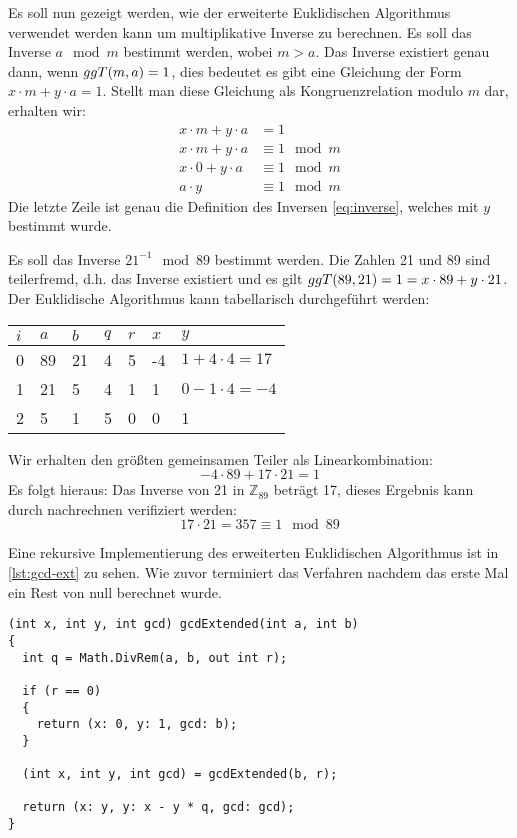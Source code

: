 \noindent
Es soll nun gezeigt werden, wie der erweiterte Euklidischen Algorithmus verwendet werden kann
um multiplikative Inverse zu berechnen. Es soll das Inverse $a \mod{m}$ bestimmt werden, wobei
$m > a$. Das Inverse existiert genau dann, wenn $ggT(m,a) = 1$, dies bedeutet es gibt
eine Gleichung der Form $x \cdot m + y \cdot a = 1$. Stellt man diese Gleichung
als Kongruenzrelation modulo $m$ dar, erhalten wir:
\begin{align*}
  x \cdot m + y \cdot a & = 1              \\
  x \cdot m + y \cdot a & \equiv 1 \mod{m} \\
  x \cdot 0 + y \cdot a & \equiv 1 \mod{m} \\
  a \cdot y             & \equiv 1 \mod{m}
\end{align*}
Die letzte Zeile ist genau die Definition des Inversen \eqref{eq:inverse}, welches
mit $y$ bestimmt wurde.
\begin{example}
  Es soll das Inverse $21^{-1} \mod{89}$ bestimmt werden. Die Zahlen 21 und 89 sind
  teilerfremd, d.h. das Inverse existiert und es gilt
  $ggT(89,21) = 1 = x \cdot 89 + y \cdot 21$. Der Euklidische
  Algorithmus kann tabellarisch durchgeführt werden:
  \begin{center}
    \centering
    \begin{tabular}{|l|l|l|l|l|l|l|}
      \hline
      $i$ & $a$ & $b$ & $q$ & $r$ & $x$ & $y$                  \\ \hline
      0   & 89  & 21  & 4   & 5   & -4  & $1 + 4 \cdot 4 = 17$ \\ \hline
      1   & 21  & 5   & 4   & 1   & 1   & $0 - 1 \cdot 4 = -4$ \\ \hline
      2   & 5   & 1   & 5   & 0   & 0   & 1                    \\ \hline
    \end{tabular}
  \end{center}
  \noindent
  Wir erhalten den größten gemeinsamen Teiler als Linearkombination:
  \begin{equation*}
    -4 \cdot 89 + 17 \cdot 21 = 1
  \end{equation*}
  Es folgt hieraus: Das Inverse von 21 in $\mathbb{Z}_{89}$ beträgt 17, dieses Ergebnis kann durch nachrechnen
  verifiziert werden:
  \begin{equation*}
    17 \cdot 21 = 357 \equiv 1 \mod{89}
  \end{equation*}
\end{example}

\noindent
Eine rekursive Implementierung des erweiterten Euklidischen Algorithmus ist in
\autoref{lst:gcd-ext} zu sehen.
Wie zuvor terminiert das Verfahren nachdem das erste
Mal ein Rest von null berechnet wurde.
\begin{lstlisting}[caption=Erweiterter Euklidischer Algorithmus, label=lst:gcd-ext]
(int x, int y, int gcd) gcdExtended(int a, int b)
{
  int q = Math.DivRem(a, b, out int r);

  if (r == 0)
  {
    return (x: 0, y: 1, gcd: b);
  }

  (int x, int y, int gcd) = gcdExtended(b, r);

  return (x: y, y: x - y * q, gcd: gcd);
}
\end{lstlisting}


